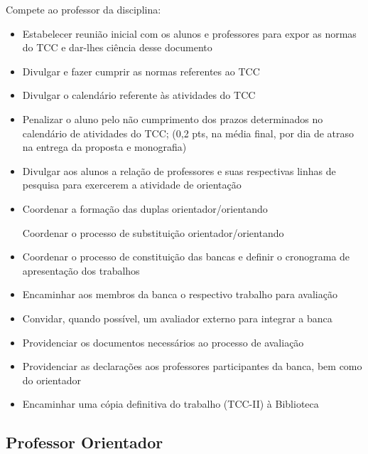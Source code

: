 Compete ao professor da disciplina:

	\begin{itemize}
		\item Estabelecer reunião inicial com os alunos e professores para expor as normas do TCC e dar-lhes ciência desse documento

		\item Divulgar e fazer cumprir as normas referentes ao TCC
		
		\item Divulgar o calendário referente às atividades do TCC

		\item Penalizar o aluno pelo não cumprimento dos prazos determinados no calendário de atividades do TCC; (0,2 pts, na média final, por dia de atraso na entrega 		da proposta e monografia)
		
		\item Divulgar aos alunos a relação de professores e suas respectivas linhas de pesquisa para exercerem a atividade de orientação
		
		\item Coordenar a formação das duplas orientador/orientando

		\intem Coordenar o processo de substituição orientador/orientando
		
		\item Coordenar o processo de constituição das bancas e definir o cronograma de apresentação dos trabalhos
		
		\item Encaminhar aos membros da banca o respectivo trabalho para avaliação
		
		\item Convidar, quando possível, um avaliador externo para integrar a banca
		
		\item Providenciar os documentos necessários ao processo de avaliação

		\item Providenciar as declarações aos professores participantes da banca, bem como do orientador
		
		\item Encaminhar uma cópia definitiva do trabalho (TCC-II) à Biblioteca
		
	\end{itemize}


\subsection{Professor Orientador}

